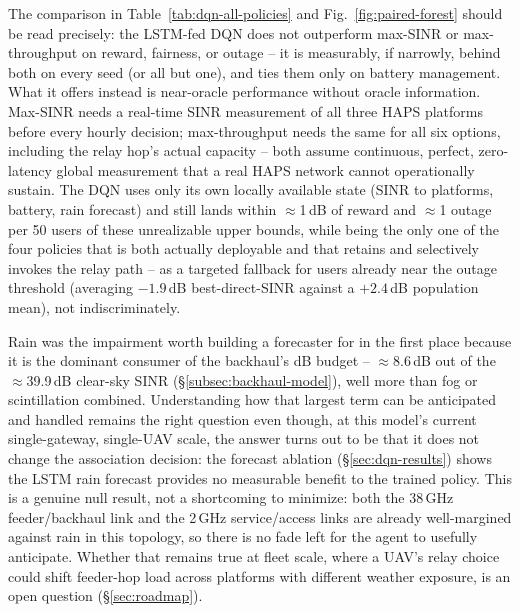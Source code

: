 \documentclass[]{ieeeaccess}
\begin{document}
The comparison in Table~\ref{tab:dqn-all-policies} and Fig.~\ref{fig:paired-forest} should be read precisely: the LSTM-fed DQN does not outperform max-SINR or max-throughput on reward, fairness, or outage -- it is measurably, if narrowly, behind both on every seed (or all but one), and ties them only on battery management. What it offers instead is near-oracle performance without oracle information. Max-SINR needs a real-time SINR measurement of all three HAPS platforms before every hourly decision; max-throughput needs the same for all six options, including the relay hop's actual capacity -- both assume continuous, perfect, zero-latency global measurement that a real HAPS network cannot operationally sustain. The DQN uses only its own locally available state (SINR to platforms, battery, rain forecast) and still lands within $\approx$1\,dB of reward and $\approx$1 outage per 50 users of these unrealizable upper bounds, while being the only one of the four policies that is both actually deployable and that retains and selectively invokes the relay path -- as a targeted fallback for users already near the outage threshold (averaging $-1.9$\,dB best-direct-SINR against a $+2.4$\,dB population mean), not indiscriminately.

Rain was the impairment worth building a forecaster for in the first place because it is the dominant consumer of the backhaul's dB budget -- $\approx$8.6\,dB out of the $\approx$39.9\,dB clear-sky SINR (\S\ref{subsec:backhaul-model}), well more than fog or scintillation combined. Understanding how that largest term can be anticipated and handled remains the right question even though, at this model's current single-gateway, single-UAV scale, the answer turns out to be that it does not change the association decision: the forecast ablation (\S\ref{sec:dqn-results}) shows the LSTM rain forecast provides no measurable benefit to the trained policy. This is a genuine null result, not a shortcoming to minimize: both the 38\,GHz feeder/backhaul link and the 2\,GHz service/access links are already well-margined against rain in this topology, so there is no fade left for the agent to usefully anticipate. Whether that remains true at fleet scale, where a UAV's relay choice could shift feeder-hop load across platforms with different weather exposure, is an open question (\S\ref{sec:roadmap}).
\end{document}
